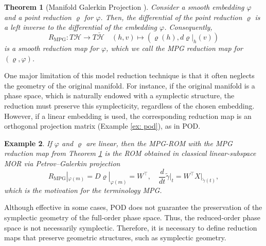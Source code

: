 \documentclass{article}
\theoremstyle{plain}
\newtheorem{theorem}{Theorem}[section]
\theoremstyle{definition}
\newtheorem{example}[theorem]{Example}
\theoremstyle{remark}
\begin{document}
\begin{theorem}[Manifold Galerkin Projection \cite{buchfink2024}]
\label{them: manifold_galerkin_projection}
\textit{Consider a smooth embedding $\varphi$ and a point reduction $\varrho$ for $\varphi$. Then, the differential of the point reduction $\varrho$ is a left inverse to the differential of the embedding $\varphi$. Consequently,}
\begin{equation}
R_{\text{MPG}}: T\mathcal{H} \to T\check{\mathcal{H}} \quad (h, v) \mapsto (\varrho(h), d\varrho|_h(v)) 
\end{equation}
\textit{is a smooth reduction map for $\varphi$, which we call the MPG reduction map for $(\varrho, \varphi)$.}
\end{theorem}

One major limitation of this model reduction technique is that it often neglects the geometry of the original manifold. For instance, if the original manifold is a phase space, which is naturally endowed with a symplectic structure, the reduction must preserve this symplecticity, regardless of the chosen embedding. However, if a linear embedding is used, the corresponding reduction map is an orthogonal projection matrix (Example \ref{ex: pod}), as in POD.
\begin{example}
\textit{If $\varphi$ and $\varrho$ are linear, then the MPG-ROM with the MPG reduction map from Theorem \ref{them: manifold_galerkin_projection} is the ROM obtained in classical linear-subspace MOR via Petrov--Galerkin projection}
\begin{equation}
R_{\text{MPG}}|_{\varphi(m)} = D\varrho|_{\varphi(m)} = W^{\top}, \quad \frac{d}{dt}\tilde{\gamma}\bigg|_t = W^{\top} X|_{\tilde{\gamma}(t)},
\end{equation}
\textit{which is the motivation for the terminology MPG.} 
\end{example}
Although effective in some cases, POD does not guarantee the preservation of the symplectic geometry of the full-order phase space. Thus, the reduced-order phase space is not necessarily symplectic. Therefore, it is necessary to define reduction maps that preserve geometric structures, such as symplectic geometry. 
\end{document}
